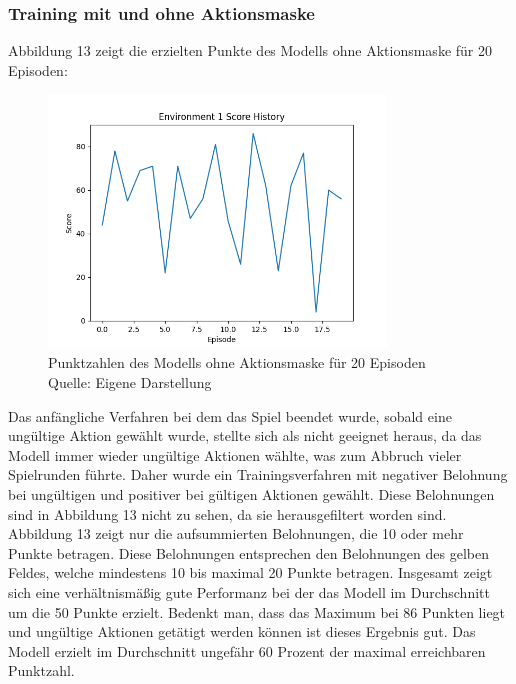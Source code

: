 \subsubsection{Training mit und ohne Aktionsmaske}
Abbildung 13 zeigt die erzielten Punkte des Modells ohne Aktionsmaske für 20 Episoden:
\nopagebreak
\begin{figure}[H]
	\centering
	\includegraphics[width=0.8\textwidth]{Bilder/trainingwithoutcancalation} 
	\caption[Punktzahlen des Modells ohne Aktionsmaske für 20 Episoden]{Punktzahlen des Modells ohne Aktionsmaske für 20 Episoden\\ Quelle: Eigene Darstellung}
\end{figure}

Das anfängliche Verfahren bei dem das Spiel beendet wurde, sobald eine ungültige Aktion gewählt wurde, stellte sich als nicht geeignet heraus, da das Modell immer wieder ungültige Aktionen wählte, was zum Abbruch vieler Spielrunden führte. Daher wurde ein Trainingsverfahren mit negativer Belohnung bei ungültigen und positiver bei gültigen Aktionen gewählt. Diese Belohnungen sind in Abbildung 13 nicht zu sehen, da sie herausgefiltert worden sind. Abbildung 13 zeigt nur die aufsummierten Belohnungen, die 10 oder mehr Punkte betragen. Diese Belohnungen entsprechen den Belohnungen des gelben Feldes, welche mindestens 10 bis maximal 20 Punkte betragen. Insgesamt zeigt sich eine verhältnismäßig gute Performanz bei der das Modell im Durchschnitt um die 50 Punkte erzielt. Bedenkt man, dass das Maximum bei 86 Punkten liegt und ungültige Aktionen getätigt werden können ist dieses Ergebnis gut. Das Modell erzielt im Durchschnitt ungefähr 60 Prozent der maximal erreichbaren Punktzahl.\\

